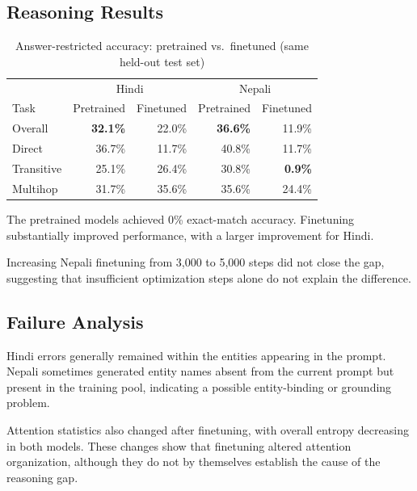 \documentclass[10pt,a4paper]{article}
\begin{document}
\subsection{Reasoning Results}

\begin{table}[H]\centering
\caption{Answer-restricted accuracy: pretrained vs.\ finetuned (same held-out test set)}
\small
\begin{tabular}{lrrrr}\toprule
& \multicolumn{2}{c}{Hindi} & \multicolumn{2}{c}{Nepali}\\
Task & Pretrained & Finetuned & Pretrained & Finetuned\\\midrule
Overall & \textbf{32.1\%} & 22.0\% & \textbf{36.6\%} & 11.9\%\\
Direct & 36.7\% & 11.7\% & 40.8\% & 11.7\%\\
Transitive & 25.1\% & 26.4\% & 30.8\% & \textbf{0.9\%}\\
Multihop & 31.7\% & 35.6\% & 35.6\% & 24.4\%\\
\bottomrule\end{tabular}
\end{table}


The pretrained models achieved 0\% exact-match accuracy. Finetuning
substantially improved performance, with a larger improvement for
Hindi.

Increasing Nepali finetuning from 3,000 to 5,000 steps did not close
the gap, suggesting that insufficient optimization steps alone do not
explain the difference.

\subsection{Failure Analysis}
Hindi errors generally remained within the entities appearing in the
prompt. Nepali sometimes generated entity names absent from the
current prompt but present in the training pool, indicating a possible
entity-binding or grounding problem.

Attention statistics also changed after finetuning, with overall
entropy decreasing in both models. These changes show that finetuning
altered attention organization, although they do not by themselves
establish the cause of the reasoning gap.
\end{document}
